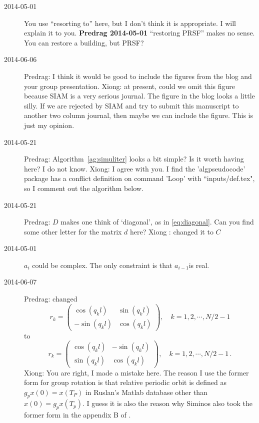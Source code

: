 \begin{description}
\item[2014-05-01]
You use ``resorting to'' here, but I don't
think it is appropriate. I will explain it to you.
\textbf{Predrag 2014-05-01} ``restoring PRSF'' makes no sense. You can
restore a building, but PRSF?

\item[2014-06-06]
Predrag: I think it would be good to include the figures from the blog and your group presentation. Xiong: at present, could we omit this
figure because SIAM is a very serious journal. The figure in the blog looks a little silly. If we are rejected by SIAM and try to submit this manuscript to another two column journal, then maybe we can include the figure. This is just my opinion.

\item[2014-05-21]
  Predrag: Algorithm~\ref{ag:simuliter} looks a bit simple? Is it worth
  having here? I do not know.
  Xiong: I agree with you. I find the 'algpseudocode' package has a
  conflict definition on command 'Loop' with ``inputs/def.tex", so
  I comment out the algorithm below.


\item[2014-05-21]
  Predrag: $D$ makes one think of `diagonal', as in \eqref{eq:diagonal}.
  Can you find some other letter for the matrix $d$ here?
  Xiong : changed it to $C$
\item[2014-05-01]
  $a_{i}$ could be complex. The only constraint is that $a_{i-1}$is real.

\item[2014-06-07]
Predrag: changed
\[
r_{k}=
\begin{pmatrix}
  \cos(q_{k}l) & \sin(q_{k}l) \\
  -\sin(q_{k}l) & \cos(q_{k}l)
\end{pmatrix}
,\quad k=1,2,\cdots,N/2-1
\]
to
\[
r_{k}=
\begin{pmatrix}
  \cos(q_{k}l) & -\sin(q_{k}l) \\
  \sin(q_{k}l) & \cos(q_{k}l)
\end{pmatrix}
,\quad k=1,2,\cdots,N/2-1
\,.
\]
Xiong: You are right, I made a mistake here. The reason I use the former
form for group rotation is that relative periodic orbit is defined
as $g_px(0)=x(T_P)$ in Ruslan's Matlab database other than
$x(0)=g_px(T_p)$. I guess it is also the reason why Siminos also took
the former form in the appendix B of \cite{SCD07}.


\end{description}
